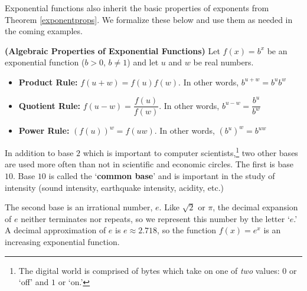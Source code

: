 \documentclass{ximera}
\begin{document}

\smallskip


Exponential functions also inherit the basic properties of exponents from Theorem \ref{exponentprops}.  We formalize these below and use them as needed in the coming examples.

\smallskip


\begin{theorem}  \label{algpropexpfcns} \textbf{(Algebraic Properties of Exponential Functions)}  Let $f(x) = b^{x}$ be an exponential function ($b > 0$, $b\neq 1$) and let $u$ and $w$ be real numbers. 

\begin{itemize}

\item  \textbf{Product Rule:}  $f(u+w) = f(u) f(w)$.  In other words, $b^{u+w} = b^{u} b^{w}$

\item  \textbf{Quotient Rule:}  $f(u-w) = \dfrac{f(u)}{f(w)}$.  In other words, $b^{u-w} = \dfrac{b^{u}}{b^{w}}$

\item  \textbf{Power Rule:}  $\left(f(u)\right)^w = f(uw)$.  In other words, $\left(b^{u}\right)^{w} = b^{uw}$

\end{itemize}

\end{theorem}


\smallskip

In addition to base $2$ which is important to computer scientists,\footnote{The digital world is comprised of bytes which take on one of \textit{two} values: $0$ or `off' and $1$ or `on.'} two other bases are used more often than not in scientific and economic circles.  The first is base  $10$.  Base $10$ is called the `\textbf{common base}' and is important in the study of intensity (sound intensity, earthquake intensity, acidity, etc.)   

\smallskip


The second base is an irrational number, $e$.  Like $\sqrt{2}$ or $\pi$, the decimal expansion of $e$ neither terminates nor repeats, so we represent this number by the letter `$e$.'  A decimal approximation of $e$ is $e \approx 2.718$, so the function $f(x) = e^{x}$ is an increasing exponential function.   
\end{document}
